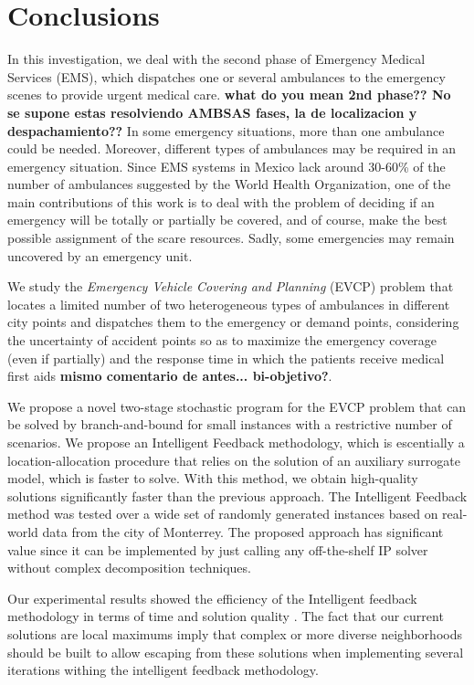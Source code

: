 \chapter{Conclusions}\label{cap:concl}


In this investigation, we deal with the second phase of Emergency Medical Services (EMS), which dispatches one or several ambulances to the emergency scenes to provide urgent medical care. \textbf{what do you mean 2nd phase?? No se supone estas resolviendo AMBSAS fases, la de localizacion y despachamiento??} In some emergency situations, more than one ambulance could be needed. Moreover, different types of ambulances may be required in an emergency situation. Since EMS systems in Mexico lack around 30-60\% of the number of ambulances suggested by the World Health Organization, one of the main contributions of this work is to deal with the problem of deciding if an emergency will be totally or partially be covered, and of course, make the best possible assignment of the scare resources. Sadly, some emergencies may remain uncovered by an emergency unit. 

We study the \textit{Emergency Vehicle Covering and Planning} (EVCP) problem that locates a limited number of two heterogeneous types of ambulances in different city points and dispatches them to the emergency or demand points, considering the uncertainty of accident points so as to maximize the emergency coverage (even if partially) and the response time in which the patients receive medical first aids \textbf{mismo comentario de antes... bi-objetivo?}.

We propose a novel two-stage stochastic program for the EVCP problem that can be solved by branch-and-bound for small instances with a restrictive number of scenarios. We propose an Intelligent Feedback methodology, which is escentially a location-allocation procedure that relies on the solution of an auxiliary surrogate model, which is faster to solve. With this method, we obtain high-quality solutions significantly faster than the previous approach. The Intelligent Feedback method was tested over a wide set of randomly generated instances based on real-world data from the city of Monterrey.
The proposed approach has significant value since it can be implemented by just calling any off-the-shelf IP solver without complex decomposition techniques.

 Our experimental results showed the efficiency of the Intelligent feedback methodology in terms of time and solution quality . The fact that our current solutions are local maximums imply that complex or more diverse neighborhoods should be built to allow escaping from these solutions when implementing several iterations withing the intelligent feedback methodology.  

